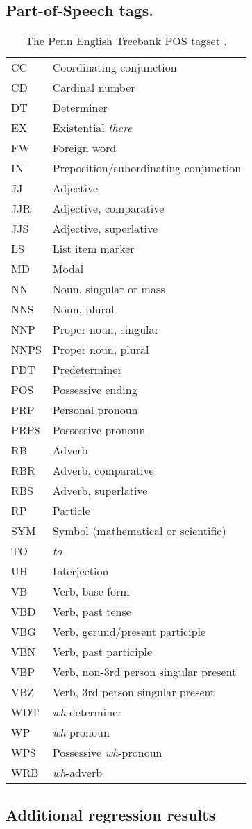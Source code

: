 \subsection{Part-of-Speech tags.}
%
\begin{table}[!h]
	\tiny
	\caption[The Penn English Treebank POS tagset]{The Penn English Treebank POS tagset \parencite{Marcus.1993}.}
	\label{tab:POS_tags}
	\centering
	\begin{tabular}{ll}
		\toprule
		CC& Coordinating conjunction \\
		CD& Cardinal number\\
		DT& Determiner\\
		EX& Existential \textit{there}\\
		FW& Foreign word\\
		IN& Preposition/subordinating conjunction\\
		JJ& Adjective\\
		JJR& Adjective, comparative\\
		JJS& Adjective, superlative\\
		LS& List item marker\\
		MD& Modal\\
		NN& Noun, singular or mass\\
		NNS& Noun, plural\\
		NNP& Proper noun, singular\\
		NNPS& Proper noun, plural\\
		PDT& Predeterminer\\
		POS& Possessive ending\\
		PRP& Personal pronoun\\
		PRP\$& Possessive pronoun\\
		RB& Adverb\\
		RBR& Adverb, comparative\\
		RBS& Adverb, superlative\\
		RP& Particle\\
		SYM& Symbol (mathematical or scientific)\\
		TO& \textit{to}\\
		UH& Interjection\\
		VB& Verb, base form\\
		VBD& Verb, past tense\\
		VBG& Verb, gerund/present participle\\
		VBN& Verb, past participle\\
		VBP& Verb, non-3rd person singular present \\
		VBZ& Verb, 3rd person singular present\\
		WDT& \textit{wh}-determiner\\
		WP& \textit{wh}-pronoun\\
		WP\$& Possessive \textit{wh}-pronoun\\
		WRB& \textit{wh}-adverb\\
		\bottomrule
	\end{tabular}
\end{table}
%

\newpage
\subsection{Additional regression results}
%


%


%
